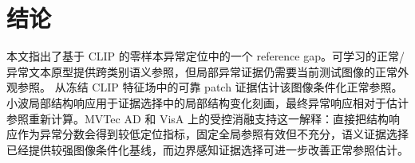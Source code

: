 \section{结论}
\label{sec:conclusion}

本文指出了基于 CLIP 的零样本异常定位中的一个 reference gap。可学习的正常/异常文本原型提供跨类别语义参照，但局部异常证据仍需要当前测试图像的正常外观参照。\method{} 从冻结 CLIP 特征场中的可靠 patch 证据估计该图像条件化正常参照。小波局部结构响应用于证据选择中的局部结构变化刻画，最终异常响应相对于估计参照重新计算。MVTec AD 和 VisA 上的受控消融支持这一解释：直接把结构响应作为异常分数会得到较低定位指标，固定全局参照有效但不充分，语义证据选择已经提供较强图像条件化基线，而边界感知证据选择可进一步改善正常参照估计。
